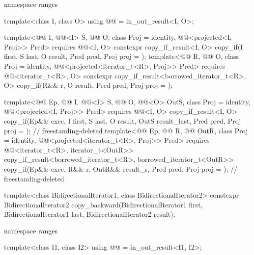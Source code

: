 \begin{codeblock}
{  namespace ranges {
    template<class I, class O>
      using @@ = in_out_result<I, O>;

    template<@@ I, @@<I> S, @@ O, class Proj = identity,
             @@<projected<I, Proj>> Pred>
      requires @@<I, O>
      constexpr copy_if_result<I, O>
        copy_if(I first, S last, O result, Pred pred, Proj proj = {});
    template<@@ R, @@ O, class Proj = identity,
             @@<projected<iterator_t<R>, Proj>> Pred>
      requires @@<iterator_t<R>, O>
      constexpr copy_if_result<borrowed_iterator_t<R>, O>
        copy_if(R&& r, O result, Pred pred, Proj proj = {});

    template<@@ Ep, @@ I, @@<I> S,
             @@ O, @@<O> OutS,
             class Proj = identity, @@<projected<I, Proj>> Pred>
      requires @@<I, O>
      copy_if_result<I, O>
        copy_if(Ep&& exec, I first, S last, O result, OutS result_last,
                Pred pred, Proj proj = {});                     // freestanding-deleted
    template<@@ Ep, @@ R, @@ OutR,
             class Proj = identity,
             @@<projected<iterator_t<R>, Proj>> Pred>
      requires @@<iterator_t<R>, iterator_t<OutR>>
      copy_if_result<borrowed_iterator_t<R>, borrowed_iterator_t<OutR>>
        copy_if(Ep&& exec, R&& r, OutR&& result_r, Pred pred,
                Proj proj = {});                                // freestanding-deleted
  }

  template<class BidirectionalIterator1, class BidirectionalIterator2>
    constexpr BidirectionalIterator2
      copy_backward(BidirectionalIterator1 first, BidirectionalIterator1 last,
                    BidirectionalIterator2 result);

  namespace ranges {
    template<class I1, class I2>
      using @@ = in_out_result<I1, I2>;

}}
\end{codeblock}

